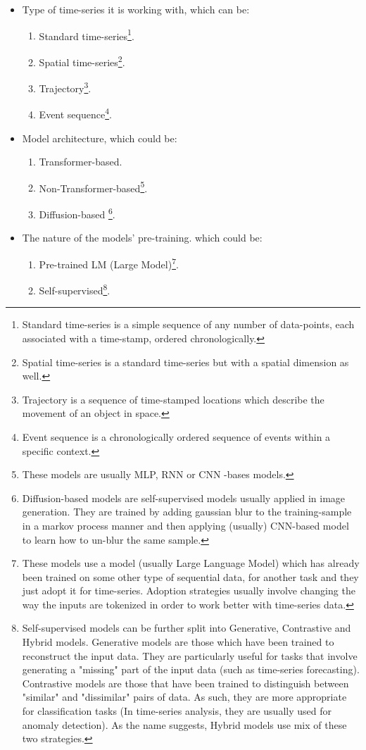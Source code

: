 \begin{itemize}
    \item Type of time-series it is working with, which can be:
    \begin{enumerate}
        \item Standard time-series\footnote{Standard time-series is a simple sequence of any number of data-points, each associated with a time-stamp, ordered chronologically.}.
        \item Spatial time-series\footnote{Spatial time-series is a standard time-series but with a spatial dimension as well.}.
        \item Trajectory\footnote{Trajectory is a sequence of time-stamped locations which describe the movement of an object in space.}.
        \item Event sequence\footnote{Event sequence is a chronologically ordered sequence of events within a specific context.}.
    \end{enumerate}
    \item Model architecture, which could be:
    \begin{enumerate}
        \item Transformer-based.
        \item Non-Transformer-based\footnote{These models are usually MLP, RNN or CNN -bases models.}.
        \item Diffusion-based \cite{sohl2015deep} \cite{ho2020denoising}\footnote{Diffusion-based models are self-supervised models usually applied in image generation. They are trained by adding gaussian blur to the training-sample in a markov process manner and then applying (usually) CNN-based model to learn how to un-blur the same sample.}.
    \end{enumerate}
    \item The nature of the models' pre-training. which could be:
    \begin{enumerate}
        \item Pre-trained LM (Large Model)\footnote{These models use a model (usually Large Language Model) which has already been trained on some other type of sequential data, for another task and they just adopt it for time-series. Adoption strategies usually involve changing the way the inputs are tokenized in order to work better with time-series data.}.
        \item Self-supervised\footnote{Self-supervised models can be further split into Generative, Contrastive and Hybrid models. Generative models are those which have been trained to reconstruct the input data. They are particularly useful for tasks that involve generating a "missing" part of the input data (such as time-series forecasting). Contrastive models are those that have been trained to distinguish between "similar" and "dissimilar" pairs of data. As such, they are more appropriate for classification tasks (In time-series analysis, they are usually used for anomaly detection). As the name suggests, Hybrid models use mix of these two strategies.}.

\end{enumerate}
\end{itemize}
